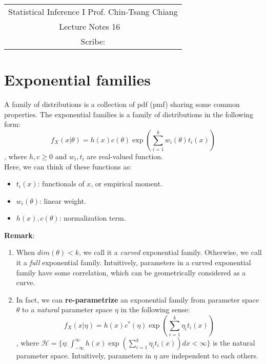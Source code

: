 \documentclass[../Distributions.tex]{subfiles}
\begin{document}
	\begin{center}
		\renewcommand{\arraystretch}{2}
		\begin{bfseries}
			\begin{tabular}{|c|}
				\hline
				Statistical Inference I \hfill Prof. Chin-Tsang Chiang\\
				\hspace{15em} {\large Lecture Notes 16} \hspace{15em}\ \\
				\lecdate \hfill Scribe: \scribe\\
				\hline
			\end{tabular}
			\renewcommand{\arraystretch}{1}
		\end{bfseries}
	\end{center}

\section{Exponential families}
A family of distributions is a collection of pdf (pmf) sharing some common properties. The exponential families is a family of distributions in the following form:
$$f_X(x|\theta) = h(x)c(\theta)\exp(\sum_{i=1}^kw_i(\theta)t_i(x))$$
, where $h,c\geq0$ and $w_i,t_i$ are real-valued function.\\
Here, we can think of these functions as:
\begin{itemize}
	\item $t_i(x)$: functionals of $x$, or empirical moment.
	\item $w_i(\theta)$: linear weight.
	\item $h(x),c(\theta)$: normalization term.
\end{itemize}
{\bf Remark}:
\begin{enumerate}
	\item When $dim(\theta)<k$, we call it a {\it curved} exponential family. Otherwise, we call it a {\it full} exponential family. Intuitively, parameters in a curved exponential family have some correlation, which can be geometrically considered as a curve.
	\item In fact, we can {\bf re-parametrize} an exponential family from parameter space $\theta$ to a {\it natural} parameter space $\eta$ in the following sense:
	$$f_X(x|\eta) = h(x)c^*(\eta)\exp(\sum_{i=1}^k\eta_i t_i(x))$$
	, where $\mathcal{H} = \{\eta:\int_{-\infty}^{\infty}h(x)\exp(\sum_{i=1}^k\eta_i t_i(x))dx<\infty \}$ is the natural parameter space. Intuitively, parameters in $\eta$ are independent to each others.
\end{enumerate}
\end{document}
